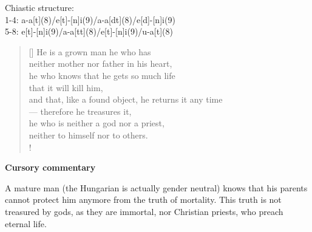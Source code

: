 \documentclass[a4paper,12pt,twoside,final]{book}
\begin{document}
\noindent Chiastic structure: \\
1-4: a-a[t](8)/e[t]-[n]i(9)/a-a[dt](8)/e[d]-[n]i(9) \\
5-8: e[t]-[n]i(9)/a-a[tt](8)/e[t]-[n]i(9)/u-a[t](8)

\newpage


\settowidth{\versewidth}{and that, like a found object, he returns it any time}

\begin{verse}[\versewidth]
  He is a grown man he who has \\
  neither mother nor father in his heart, \\
  he who knows that he gets so much life \\
  that it will kill him, \\
  and that, like a found object, he returns it any time \\
  --- therefore he treasures it, \\
  he who is neither a god nor a priest, \\
  neither to himself nor to others. \\!
\end{verse}


\bigskip

\noindent \textbf{Cursory commentary}

\medskip

A mature man (the Hungarian is actually gender neutral) knows that his
parents cannot protect him anymore from the truth of mortality. This
truth is not treasured by gods, as they are immortal, nor Christian
priests, who preach eternal life.

\newpage

\settowidth{\versewidth}{s mint talált tárgyat visszaadja}
\end{document}
